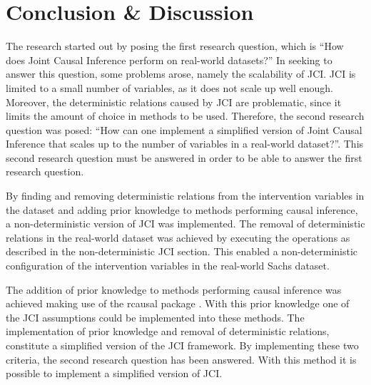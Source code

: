\documentclass[a4paper,pdf]{article}
\newcommand{\Sara}[1]{{\color{blue} Sara: #1}}
\begin{document}
\section{Conclusion \& Discussion}


The research started out by posing the first research question, which is ``How does Joint Causal Inference perform on real-world datasets?'' In seeking to answer this question, some problems arose, namely the scalability of JCI. JCI is limited to a small number of variables, as it does not scale up well enough. Moreover, the deterministic relations caused by JCI are problematic, since it limits the amount of choice in methods to be used. Therefore, the second research question was posed: ``How can one implement a simplified version of Joint Causal Inference that scales up to the number of variables in a real-world dataset?''. This second research question must be answered in order to be able to answer the first research question.

By finding and removing deterministic relations from the intervention variables in the dataset and adding prior knowledge to methods performing causal inference, a non-deterministic version of JCI was implemented. The removal of deterministic relations in the real-world dataset was achieved by executing the operations as described in the non-deterministic JCI section. This enabled a non-deterministic configuration of the intervention variables in the real-world Sachs dataset. 

The addition of prior knowledge to methods performing causal inference was achieved making use of the rcausal package \cite{r-wrapper}. With this prior knowledge one of the JCI assumptions could be implemented into these methods. The implementation of prior knowledge and removal of deterministic relations, constitute a simplified version of the JCI framework. By implementing these two criteria, the second research question has been answered. With this method it is possible to implement a simplified version of JCI.
\end{document}

